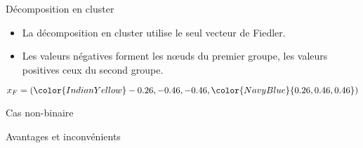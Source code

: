 \begin{frame}{Décomposition en cluster}
    \begin{minipage}{0.64\linewidth}
        \begin{itemize}
            \item La décomposition en cluster utilise le seul vecteur de Fiedler.
            \item Les valeurs négatives forment les nœuds du premier groupe, les valeurs positives ceux du second groupe.
        \end{itemize}
        $x_F = ({\color{IndianYellow}-0.26, -0.46, -0.46}, {\color{NavyBlue}{0.26, 0.46, 0.46}})$
    \end{minipage}
    \begin{minipage}{0.34\linewidth}
    \end{minipage}
\end{frame}

\begin{frame}{Cas non-binaire}
\end{frame}

\begin{frame}{Avantages et inconvénients}
\end{frame}